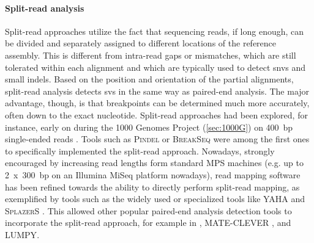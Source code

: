 \paragraph{Split-read analysis}
Split-read approaches utilize the fact that sequencing reads, if long enough,
can be divided and separately assigned to different locations of the
reference assembly. This is different from intra-read
gaps or mismatches, which are still tolerated within each alignment and
which are typically used to detect \acp{snv} and small indels.
Based on the position and orientation of the partial alignments, split-read
analysis detects \acp{sv} in the same way as paired-end analysis. The major
advantage, though, is that breakpoints can be determined much more accurately,
often down to the exact nucleotide.
Split-read approaches had been explored, for instance, early on during the
1000 Genomes Project (\cref{sec:1000G}) on 400~bp single-ended reads
\citep{Zhang2011}. Tools such as \textsc{Pindel} \citep{Ye2009} or
\textsc{BreakSeq} \citep{Lam2010} were among the first ones to specifically
implemented the split-read approach. Nowadays, strongly encouraged by increasing
read lengths form standard MPS machines (e.g. up to 2~x~300~bp on an Illumina
MiSeq platform nowadays), read mapping software has been refined towards the
ability to directly perform split-read mapping, as exemplified by tools such as
the widely used \bwamem or specialized tools like \textsc{YAHA}
\citep{Faust2012} and \textsc{SplazerS} \citep{Emde2012}.
This allowed other popular paired-end analysis detection tools to incorporate
the split-read approach, for example in \delly, \textsc{MATE-CLEVER}
\citep{Marschall2013}, and \textsc{LUMPY}.


